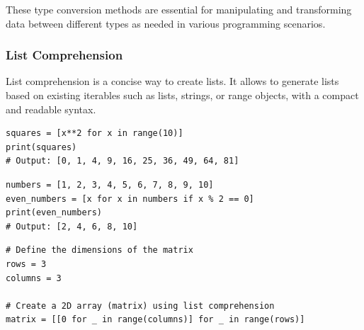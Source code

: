 These type conversion methods are essential for manipulating and transforming data between different types as needed in various programming scenarios. 

\subsubsection{List Comprehension}
List comprehension is a concise way to create lists. It allows to generate lists based on existing iterables such as lists, strings, or range objects, with a compact and readable syntax.

\begin{codebox}
\begin{verbatim}
squares = [x**2 for x in range(10)]
print(squares)
# Output: [0, 1, 4, 9, 16, 25, 36, 49, 64, 81]
\end{verbatim}
\end{codebox}

\begin{codebox}
\begin{verbatim}
numbers = [1, 2, 3, 4, 5, 6, 7, 8, 9, 10]
even_numbers = [x for x in numbers if x % 2 == 0]
print(even_numbers)
# Output: [2, 4, 6, 8, 10]
\end{verbatim}
\end{codebox}

\begin{codebox}
\begin{verbatim}
# Define the dimensions of the matrix
rows = 3
columns = 3

# Create a 2D array (matrix) using list comprehension
matrix = [[0 for _ in range(columns)] for _ in range(rows)]
\end{verbatim}
\end{codebox}

\newpage

